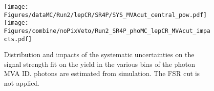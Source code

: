 \begin{figure}
  \centering
  \texttt{[image: Figures/dataMC/Run2/lepCR/SR4P/SYS\_MVAcut\_central\_pow.pdf]}
  \hfill
  \texttt{[image: Figures/combine/noPixVeto/Run2\_SR4P\_phoMC\_lepCR\_MVAcut\_impacts.pdf]}
  \caption{Distribution and impacts of the systematic uncertainties on the signal strength fit
    on the yield in the various bins of the photon MVA ID.
    \Nonprompt photons are estimated from simulation.
    The FSR cut is not applied.
  }
  \label{fig:inclusive_kin_phoMC_MVAcut}
\end{figure}
